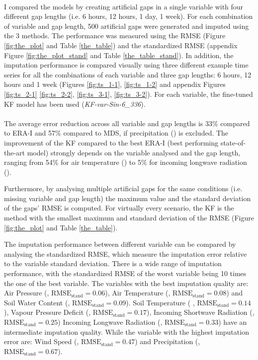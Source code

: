 \documentclass{article}
\begin{document}
\paragraph{} I compared the models by creating artificial gaps in a single variable with four different gap lengths (i.e. 6 hours, 12 hours, 1 day, 1 week). For each combination of variable and gap length, 500 artificial gaps were generated and imputed using the 3 methods. The performance was measured using the RMSE (Figure \ref{fig:the_plot} and Table \ref{the_table}) and the standardized RMSE (appendix Figure \ref{fig:the_plot_stand} and Table \ref{the_table_stand}). In addition, the imputation performance is compared visually using three different example time series for all the combinations of each variable and three gap lengths: 6 hours, 12 hours and 1 week (Figures \ref{fig:ts_1-1}, \ref{fig:ts_1-2} and appendix Figures \ref{fig:ts_2-1} \ref{fig:ts_2-2}, \ref{fig:ts_3-1}, \ref{fig:ts_3-2}). For each variable, the fine-tuned KF model has been used (\textit{KF-\textlangle var\textrangle-Sin-6\_336}).

\paragraph{}
The average error reduction across all variable and gap lengths is 33\% compared to ERA-I and 57\% compared to MDS, if precipitation () is excluded. The improvement of the KF compared to the best ERA-I (best performing state-of-the-art model) strongly depends on the variable analysed and the gap length, ranging from 54\% for air temperature () to 5\% for incoming longwave radiation ().

Furthermore, by analysing multiple artificial gaps for the same conditions (i.e. missing variable and gap length) the maximum value and the standard deviation of the gaps' RMSE is computed. For virtually every scenario, the KF is the method with the smallest maximum and standard deviation of the RMSE (Figure \ref{fig:the_plot} and Table \ref{the_table}). 

The imputation performance between different variable can be compared by analysing the standardized RMSE, which measure the imputation error relative to the variable standard deviation. There is a wide range of imputation performance, with the standardized RMSE of the worst variable being 10 times the one of the best variable.
The variables with the best imputation quality are:
Air Pressure (, $\text{RMSE}_{\text{stand}} = 0.06$),
Air Temperature (, $\text{RMSE}_{\text{stand}} = 0.08$)
and Soil Water Content (, $\text{RMSE}_{\text{stand}} = 0.09$).
Soil Temperature ( , $\text{RMSE}_{\text{stand}} = 0.14$),
Vapour Pressure Deficit (, $\text{RMSE}_{\text{stand}} = 0.17$),
Incoming Shortwave Radiation (, $\text{RMSE}_{\text{stand}} = 0.25$)
Incoming Longwave Radiation (, $\text{RMSE}_{\text{stand}} = 0.33$)
have an intermediate imputation quality.
While the variable with the highest imputation error are: Wind Speed (, $\text{RMSE}_{\text{stand}} = 0.47$) and  Precipitation (, $\text{RMSE}_{\text{stand}} = 0.67$).
\end{document}
